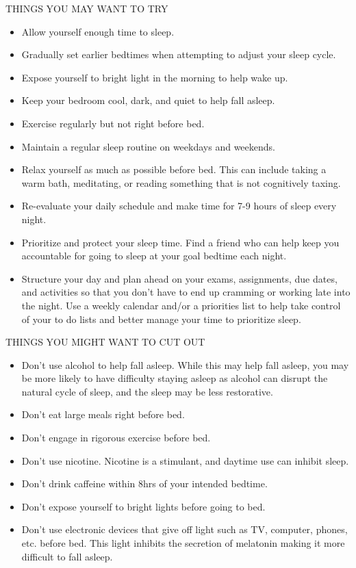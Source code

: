 \documentclass[../main.tex]{subfiles}
\begin{document}
THINGS YOU MAY WANT TO TRY
%
\begin{itemize}
  \item Allow yourself enough time to sleep.
  \item Gradually set earlier bedtimes when attempting to adjust your sleep
    cycle.
  \item Expose yourself to bright light in the morning to help wake up.
  \item Keep your bedroom cool, dark, and quiet to help fall asleep.
  \item Exercise regularly but not right before bed.
  \item Maintain a regular sleep routine on weekdays and weekends.
  \item Relax yourself as much as possible before bed. This can include taking a
    warm bath, meditating, or reading something that is not cognitively taxing.
  \item Re-evaluate your daily schedule and make time for 7-9 hours of sleep
    every night.
  \item Prioritize and protect your sleep time. Find a friend who can help keep
    you accountable for going to sleep at your goal bedtime each night.
  \item Structure your day and plan ahead on your exams, assignments, due dates,
    and activities so that you don't have to end up cramming or working late
    into the night. Use a weekly calendar and/or a priorities list to help take
    control of your to do lists and better manage your time to prioritize sleep.
\end{itemize}
%
THINGS YOU MIGHT WANT TO CUT OUT
%
\begin{itemize}
  \item Don't use alcohol to help fall asleep. While this may help fall asleep,
    you may be more likely to have difficulty staying asleep as alcohol can
    disrupt the natural cycle of sleep, and the sleep may be less restorative.
  \item Don't eat large meals right before bed.
  \item Don't engage in rigorous exercise before bed.
  \item Don't use nicotine. Nicotine is a stimulant, and daytime use can inhibit
    sleep.
  \item Don't drink caffeine within 8hrs of your intended bedtime.
  \item Don't expose yourself to bright lights before going to bed.
  \item Don't use electronic devices that give off light such as TV, computer,
    phones, etc. before bed. This light inhibits the secretion of melatonin
    making it more difficult to fall asleep.
\end{itemize}
%
\end{document}
